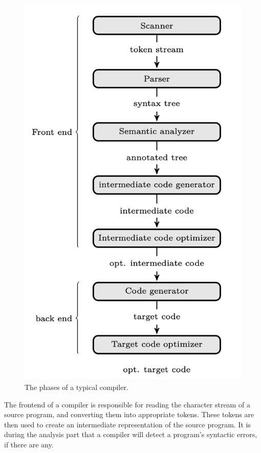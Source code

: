 \begin{figure}[ht]
    \centering
    \includegraphics[scale=0.35]{assets/compilerOutline.png}
    \caption[]{The phases of a typical compiler.\footnotemark}
    \label{fig:compilerOutline}
\end{figure}

The frontend of a compiler is responsible for reading the character stream of a source program, and converting them into appropriate tokens. These tokens are then used to create an intermediate representation of the source program. It is during the analysis part that a compiler will detect a program's syntactic errors, if there are any. \hfill \\

